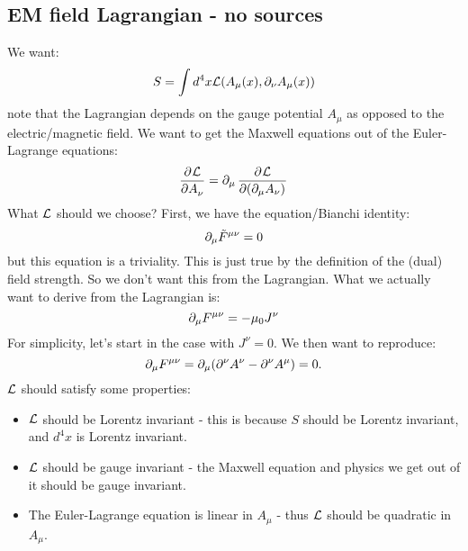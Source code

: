 \subsection{EM field Lagrangian - no sources}
We want:
\begin{equation}
    S = \int d^4x\mathcal{L}(A_\mu(x), \partial_\nu A_\mu(x))
\end{equation}
note that the Lagrangian depends on the gauge potential $A_\mu$ as opposed to the electric/magnetic field. We want to get the Maxwell equations out of the Euler-Lagrange equations:
\begin{equation}
    \dpd{\LL}{A_\nu} = \p_\mu \dpd{\LL}{(\p_\mu A_\nu)}
\end{equation}
What $\mathcal{L}$ should we choose? First, we have the equation/Bianchi identity:
\begin{equation}
    \partial_\mu \tilde{F}^{\mu\nu} = 0
\end{equation}
but this equation is a triviality. This is just true by the definition of the (dual) field strength. So we don't want this from the Lagrangian. What we actually want to derive from the Lagrangian is:
\begin{equation}
    \partial_\mu F^{\mu\nu} = -\mu_0 J^\nu
\end{equation}
For simplicity, let's start in the case with $J^\nu = 0$. We then want to reproduce:
\begin{equation}
    \partial_\mu F^{\mu\nu} = \partial_\mu(\partial^\nu A^\nu - \partial^\nu A^\mu) = 0.
\end{equation}
$\mathcal{L}$ should satisfy some properties:
\begin{itemize}
    \item  $\mathcal{L}$ should be Lorentz invariant - this is because $S$ should be Lorentz invariant, and $d^4x$ is Lorentz invariant.
    \item $\mathcal{L}$ should be gauge invariant - the Maxwell equation and physics we get out of it should be gauge invariant.
    \item The Euler-Lagrange equation is linear in $A_\mu$ - thus $\mathcal{L}$ should be quadratic in $A_\mu$.
\end{itemize}

